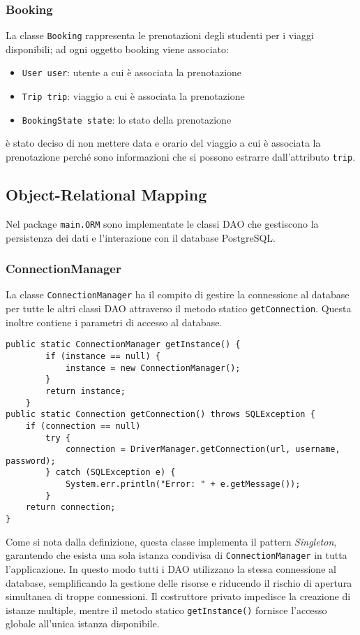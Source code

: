 \subsubsection{Booking}
La classe \texttt{Booking} rappresenta le prenotazioni degli studenti per i viaggi disponibili; ad ogni oggetto booking viene associato:
\begin{itemize}
    \item \texttt{User user}: utente a cui è associata la prenotazione
    \item \texttt{Trip trip}: viaggio a cui è associata la prenotazione
    \item \texttt{BookingState state}: lo stato della prenotazione
\end{itemize}
è stato deciso di non mettere data e orario del viaggio a cui è associata la prenotazione perché sono informazioni che si possono estrarre dall'attributo \texttt{trip}.

\subsection{Object-Relational Mapping}
Nel package \texttt{main.ORM} sono implementate le classi DAO che gestiscono la persistenza dei dati e l'interazione con il database PostgreSQL.
\subsubsection{ConnectionManager}
La classe \texttt{ConnectionManager} ha il compito di gestire la connessione al database per tutte le altri classi DAO attraverso il metodo statico \texttt{getConnection}. Questa inoltre contiene i parametri di accesso al database.
\begin{lstlisting}[style=java, caption={Implementazione del ConnectionManager}]
public static ConnectionManager getInstance() {
        if (instance == null) {
            instance = new ConnectionManager();
        }
        return instance;
    }
public static Connection getConnection() throws SQLException {
    if (connection == null)
        try {
            connection = DriverManager.getConnection(url, username, password);
        } catch (SQLException e) {
            System.err.println("Error: " + e.getMessage());
        }
    return connection;
}
\end{lstlisting}
Come si nota dalla definizione, questa classe implementa il pattern \textit{Singleton}, garantendo che esista una sola istanza condivisa di \texttt{ConnectionManager} in tutta l'applicazione. In questo modo tutti i DAO utilizzano la stessa connessione al database, semplificando la gestione delle risorse e riducendo il rischio di apertura simultanea di troppe connessioni. Il costruttore privato impedisce la creazione di istanze multiple, mentre il metodo statico \texttt{getInstance()} fornisce l'accesso globale all'unica istanza disponibile.
